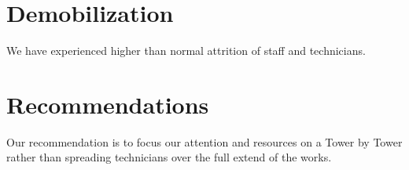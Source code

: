\section*{Demobilization}

We have experienced higher than normal attrition of staff and technicians. 

\section*{Recommendations}
Our recommendation is to focus our attention and resources on a Tower by Tower rather than spreading technicians over the full extend of the works.



